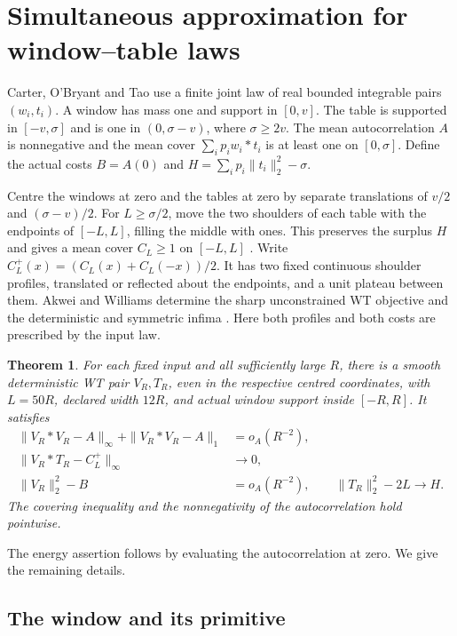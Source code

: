 \documentclass[11pt]{article}
\newtheorem{theorem}{Theorem}
\begin{document}
\section{Simultaneous approximation for window--table laws}\label{sec:wt}
Carter, O'Bryant and Tao \cite[Definition 2.1]{cot} use a finite joint law of real bounded integrable pairs \((w_i,t_i)\). A window has mass one and support in \([0,v]\). The table is supported in \([-v,\sigma]\) and is one in \((0,\sigma-v)\), where \(\sigma\ge2v\). The mean autocorrelation \(A\) is nonnegative and the mean cover \(\sum_i p_i w_i*t_i\) is at least one on \([0,\sigma]\). Define the actual costs \(B=A(0)\) and \(H=\sum_i p_i\|t_i\|_2^2-\sigma\).

Centre the windows at zero and the tables at zero by separate translations of \(v/2\) and \((\sigma-v)/2\). For \(L\ge\sigma/2\), move the two shoulders of each table with the endpoints of \([-L,L]\), filling the middle with ones. This preserves the surplus \(H\) and gives a mean cover \(C_L\ge1\) on \([-L,L]\) \cite[Lemma 2.7]{cot}. Write \(C_L^+(x)=(C_L(x)+C_L(-x))/2\). It has two fixed continuous shoulder profiles, translated or reflected about the endpoints, and a unit plateau between them. Akwei and Williams determine the sharp unconstrained WT objective and the deterministic and symmetric infima \cite{aw}. Here both profiles and both costs are prescribed by the input law.

\begin{theorem}\label{th:joint}
For each fixed input and all sufficiently large \(R\), there is a smooth deterministic WT pair \(V_R,T_R\), even in the respective centred coordinates, with \(L=50R\), declared width \(12R\), and actual window support inside \([-R,R]\). It satisfies
\begin{align*}
 \|V_R*V_R-A\|_\infty+\|V_R*V_R-A\|_1 &=o_A(R^{-2}),\\
 \|V_R*T_R-C_L^+\|_\infty &\longrightarrow0,\\
 \|V_R\|_2^2-B &=o_A(R^{-2}),\qquad \|T_R\|_2^2-2L\longrightarrow H .
\end{align*}
The covering inequality and the nonnegativity of the autocorrelation hold pointwise.
\end{theorem}
\noindent The energy assertion follows by evaluating the autocorrelation at zero. We give the remaining details.
\subsection{The window and its primitive}
\end{document}
